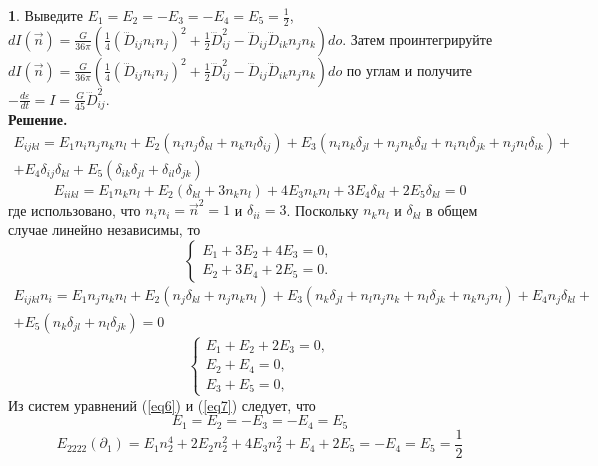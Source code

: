 \documentclass[12pt]{article}
\theoremstyle{definition}
\newtheorem{zad}{}[section]
\begin{document}
\begin{zad}
Выведите $E_1=E_2=-E_3=-E_4=E_5=\frac{1}{2}$, $dI(\vec{n})=\frac{G}{36\pi}\left(\frac{1}{4}(\dddot{D}_{ij}n_in_j)^2+\frac{1}{2}\dddot{D}_{ij}^2-\dddot{D}_{ij}\dddot{D}_{ik}n_jn_k\right)do$. Затем проинтегрируйте $dI(\vec{n})=\frac{G}{36\pi}\left(\frac{1}{4}(\dddot{D}_{ij}n_in_j)^2+\frac{1}{2}\dddot{D}_{ij}^2-\dddot{D}_{ij}\dddot{D}_{ik}n_jn_k\right)do$ по углам и получите $-\frac{d\varepsilon}{dt}=I=\frac{G}{45}\dddot{D}_{ij}^2$.\\
\textbf{Решение.}
\begin{multline}
    E_{ijkl}=E_1n_in_jn_kn_l+E_2(n_in_j\delta_{kl}+n_kn_l\delta_{ij})+E_3(n_in_k\delta_{jl}+n_jn_k\delta_{il}+n_in_l\delta_{jk}+n_jn_l\delta_{ik})+\\+E_4\delta_{ij}\delta_{kl}+E_5(\delta_{ik}\delta_{jl}+\delta_{il}\delta_{jk})
\end{multline}
\begin{equation}
    E_{iikl}=E_1n_kn_l+E_2(\delta_{kl}+3n_kn_l)+4E_3n_kn_l+3E_4\delta_{kl}+2E_5\delta_{kl}=0
\end{equation}
где использовано, что $n_in_i=\vec{n}^2=1$ и $\delta_{ii}=3$.
Поскольку $n_kn_l$ и $\delta_{kl}$ в общем случае линейно независимы, то
\begin{equation}\label{eq6}
    \begin{cases}
    E_1+3E_2+4E_3=0,\\
    E_2+3E_4+2E_5=0.
    \end{cases}
\end{equation}
\begin{multline}
    E_{ijkl}n_i=E_1n_jn_kn_l+E_2(n_j\delta_{kl}+n_jn_kn_l)+E_3(n_k\delta_{jl}+n_ln_jn_k+n_l\delta_{jk}+n_kn_jn_l)+E_4n_j\delta_{kl}+\\+E_5(n_k\delta_{jl}+n_l\delta_{jk})=0
\end{multline}
\begin{equation}\label{eq7}
    \begin{cases}
    E_1+E_2+2E_3=0,\\
    E_2+E_4=0,\\
    E_3+E_5=0,
    \end{cases}
\end{equation}
Из систем уравнений (\ref{eq6}) и (\ref{eq7}) следует, что
\begin{equation}
    E_1=E_2=-E_3=-E_4=E_5
\end{equation}
\begin{equation}
    E_{2222}(\partial_1)=E_1n_2^4+2E_2n_2^2+4E_3n_2^2+E_4+2E_5=-E_4=E_5=\frac{1}{2}

\end{equation}
\end{zad}
\end{document}
